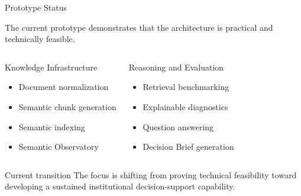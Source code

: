 \documentclass[aspectratio=169]{beamer}
\begin{document}
\begin{frame}{Prototype Status}

\small

The current prototype demonstrates that the architecture is practical
and technically feasible.

\vspace{0.25cm}

\begin{columns}[T]


\begin{block}{Knowledge Infrastructure}

\begin{itemize}
\setlength{\itemsep}{0.08cm}
\item Document normalization
\item Semantic chunk generation
\item Semantic indexing
\item Semantic Observatory
\end{itemize}

\end{block}


\begin{block}{Reasoning and Evaluation}

\begin{itemize}
\setlength{\itemsep}{0.08cm}
\item Retrieval benchmarking
\item Explainable diagnostics
\item Question answering
\item Decision Brief generation
\end{itemize}

\end{block}

\end{columns}

\vspace{0.3cm}

\begin{block}{Current transition}
The focus is shifting from proving technical feasibility toward
developing a sustained institutional decision-support capability.
\end{block}

\end{frame}
\end{document}

